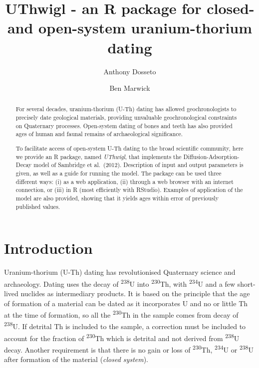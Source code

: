 \documentclass[]{elsarticle} %
\begin{document}
\begin{frontmatter}

  \title{UThwigl - an R package for closed- and open-system uranium-thorium dating}
    \author[University of Wollongong]{Anthony Dosseto}
    \author[University of Washington]{Ben Marwick}
      \address[University of Wollongong]{Wollongong Isotope Geochronology Laboratory, School of Earth, Atmosphere \& Life Sciences, University of Wollongong, Wollongong NSW Australia}
    \address[University of Washington]{Department of Anthropology, University of Washington, Seattle, WA, USA}
    
  \begin{abstract}
  For several decades, uranium-thorium (U-Th) dating has allowed geochronologists to precisely date geological materials, providing unvaluable geochronological constraints on Quaternary processes. Open-system dating of bones and teeth has also provided ages of human and faunal remains of archaeological significance.

  To facilitate access of open-system U-Th dating to the broad scientific community, here we provide an R package, named \emph{UThwigl}, that implements the Diffusion-Adsorption-Decay model of Sambridge et al.~(2012). Description of input and output parameters is given, as well as a guide for running the model. The package can be used three different ways: (i) as a web application, (ii) through a web browser with an internet connection, or (iii) in R (most efficiently with RStudio). Examples of application of the model are also provided, showing that it yields ages within error of previously published values.
  \end{abstract}
  
 \end{frontmatter}

\newpage
\linenumbers

\hypertarget{introduction}{%
\section{Introduction}\label{introduction}}

Uranium-thorium (U-Th) dating has revolutionised Quaternary science and archaeology. Dating uses the decay of \textsuperscript{238}U into \textsuperscript{230}Th, with \textsuperscript{234}U and a few short-lived nuclides as intermediary products. It is based on the principle that the age of formation of a material can be dated as it incorporates U and no or little Th at the time of formation, so all the \textsuperscript{230}Th in the sample comes from decay of \textsuperscript{238}U. If detrital Th is included to the sample, a correction must be included to account for the fraction of \textsuperscript{230}Th which is detrital and not derived from \textsuperscript{238}U decay. Another requirement is that there is no gain or loss of \textsuperscript{230}Th, \textsuperscript{234}U or \textsuperscript{238}U after formation of the material (\emph{closed system}).
\end{document}
